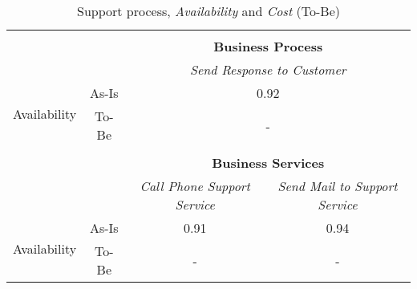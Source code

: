 \begin{table}[H]
\begin{tabular}{|c|c|p{2cm}|p{2.5cm}|p{2.5cm}|p{2.5cm}|}
		\multicolumn{6}{c}{} \\ \cline{3-6}
		\multicolumn{2}{c}{} & \multicolumn{4}{|c|}{\textbf{Business Process}} \\ \cline{3-6}
		\multicolumn{2}{c|}{} & \multicolumn{4}{|c|}{\textsl{Send Response to Customer}}\\ \hline
		\multirow{2}{*}{Availability} & As-Is & \multicolumn{4}{|c|}{0.92}\\ \cline{2-6}
									   & To-Be & \multicolumn{4}{|c|}{-}\\ \hline
		\multicolumn{6}{c}{} \\ \cline{3-6}
		\multicolumn{2}{c}{} & \multicolumn{4}{|c|}{\textbf{Business Services}} \\ \cline{3-6}
		\multicolumn{2}{c|}{} & \multicolumn{2}{|c|}{\textsl{Call Phone Support Service}} & \multicolumn{2}{|c|}{\textsl{Send Mail to Support Service}}\\ \hline
		\multirow{2}{*}{Availability} & As-Is & \multicolumn{2}{|c|}{0.91} & \multicolumn{2}{|c|}{0.94}\\ \cline{2-6}
									   & To-Be & \multicolumn{2}{|c|}{-} & \multicolumn{2}{|c|}{-}\\ \hline
	\end{tabular}
\caption{Support process, \textsl{Availability} and \textsl{Cost} (To-Be)} 
\label{tab:support_to_be}
\end{table}